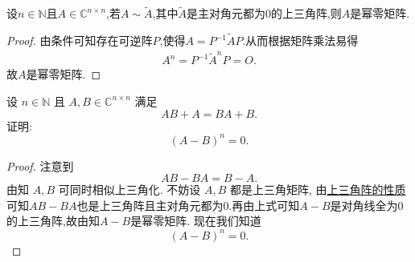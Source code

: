 \documentclass[../../main.tex]{subfiles}
\begin{document}
\begin{proposition}\label{proposition:与主对角元都为0的上三角阵相似的矩阵一定是幂零阵}
设$n\in \mathbb{N}$且$A\in \mathbb{C}^{n\times n}$,若$A\sim \widetilde{A}$,其中$\widetilde{A}$是主对角元都为0的上三角阵,则$A$是幂零矩阵.
\end{proposition}
\begin{proof}
由条件可知存在可逆阵$P$,使得$A=P^{-1}\widetilde{A}P$.从而根据矩阵乘法易得
\begin{align*}
A^n=P^{-1}\widetilde{A}^nP=O.
\end{align*}
故$A$是幂零矩阵.
\end{proof}

\begin{example}
设 $n \in \mathbb{N}$ 且 $A, B \in \mathbb{C}^{n \times n}$ 满足
\[
AB + A = BA + B.
\]
证明:
\[
(A - B)^n = 0.
\]
\end{example}
\begin{proof}
注意到
\[
AB - BA = B - A.
\]
由知 $A, B$ 可同时相似上三角化. 不妨设 $A, B$ 都是上三角矩阵, 由\hyperref[proposition:上三角阵性质]{上三角阵的性质}可知$AB-BA$也是上三角阵且主对角元都为0.再由上式可知$A - B$是对角线全为0的上三角阵,故由知$A-B$是幂零矩阵. 现在我们知道
\[
(A - B)^n = 0.
\]
\end{proof}
\end{document}
